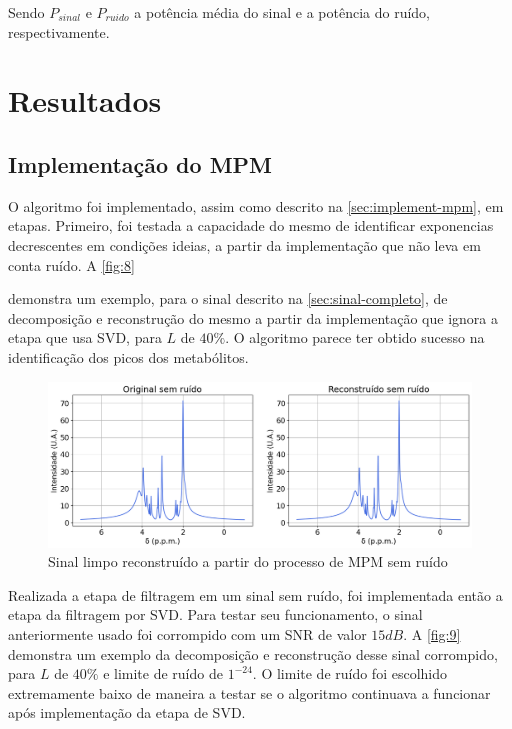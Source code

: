 \documentclass[12pt]{article}
\begin{document}
Sendo $P_{sinal}$ e $P_{ruido}$ a potência média do sinal e a potência do ruído, respectivamente. 


\section{Resultados}

\subsection{Implementação do MPM}

O algoritmo foi implementado, assim como descrito na \autoref{sec:implement-mpm}, em etapas. Primeiro, foi testada a capacidade do mesmo 
de identificar exponencias decrescentes em condições ideias, a partir da implementação que não leva em conta ruído. A \autoref{fig:8} 

demonstra um exemplo, para o sinal descrito na \autoref{sec:sinal-completo}, de decomposição e reconstrução do mesmo a partir da implementação
que ignora a etapa que usa SVD, para $L$ de $40\%$. O algoritmo parece ter obtido sucesso na identificação dos picos dos metabólitos.

\begin{figure} [H]
    \includegraphics[scale=0.5]{mpm-sem-ruido.png}
    \centering
    \caption{Sinal limpo reconstruído a partir do processo de MPM sem ruído}
    \label{fig:8}
\end{figure}

Realizada a etapa de filtragem em um sinal sem ruído, foi implementada então a etapa da filtragem por SVD. Para testar seu funcionamento, o sinal
anteriormente usado foi corrompido com um SNR de valor $15 dB$. A \autoref{fig:9} demonstra um exemplo da decomposição e reconstrução desse sinal 
corrompido, para $L$ de $40\%$ e limite de ruído de $1^{-24}$. O limite de ruído foi escolhido extremamente baixo de maneira a testar se o algoritmo 
continuava a funcionar após implementação da etapa de SVD. 
\end{document}
